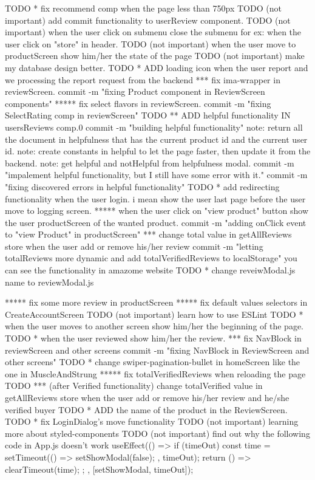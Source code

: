 {TODO * fix recommend comp when the page less than 750px
TODO (not important) add commit functionality to userReview component.
TODO (not important) when the user click on submenu close the submenu for ex: when the user click on "store" in header.
TODO (not important) when the user move to productScreen show him/her the state of the page
TODO (not important) make my database design better.
TODO * ADD loading icon when the user report and we processing the report request from the backend
*** fix ima-wrapper in reviewScreen.
    commit -m "fixing Product component in ReviewScreen components"
***** fix select flavors in reviewScreen.
    commit -m "fixing SelectRating comp in reviewScreen"
TODO ** ADD helpful functionality IN usersReviews comp.0
        commit -m "building helpful functionality"
        note: return all the document in helpfulness that has the current product id and the current user id.
        note: create constants in helpful to let the page faster, then update it from the backend.
        note: get helpful and notHelpful from helpfulness modal.
        commit -m "impalement helpful functionality, but I still have some error with it."
        commit -m "fixing discovered errors in helpful functionality"
TODO * add redirecting functionality when the user login. i mean show the user last page before the user move to logging screen.
***** when the user click on "view product" button show the user productScreen of the wanted product.
      commit -m "adding onClick event to "view Product" in productScreen"
*** change total value in getAllReviews store when the user add or remove his/her review
    commit -m "letting totalReviews more dynamic and add totalVerifiedReviews to localStorage"
      you can see the functionality in amazome website
TODO * change reveiwModal.js name to reviewModal.js

***** fix some more review in productScreen
***** fix default values selectors in CreateAccountScreen 
TODO (not important) learn how to use ESLint
TODO * when the user moves to another screen show him/her the beginning of the page.
TODO * when the user reviewed show him/her the review.
*** fix NavBlock in reviewScreen and other screens
      commit -m "fixing NavBlock in ReviewScreen and other screens"
TODO * change swiper-pagination-bullet in homeScreen like the one in MuscleAndStrung
***** fix totalVerifiedReviews when reloading the page
TODO *** (after Verified functionality) change totalVerified value in getAllReviews store when the user add or remove his/her review and he/she verified buyer
TODO * ADD the name of the product in the ReviewScreen.
TODO * fix  LoginDialog's move functionality 
TODO (not important) learning more about styled-components
TODO (not important) find out why the following code in App.js doesn't work
     useEffect(() => {
    if (timeOut) {
      const time = setTimeout(() => {
        setShowModal(false);
      }, timeOut);
      return () => {
        clearTimeout(time);
      };
    }
  }, [setShowModal, timeOut]);

}
